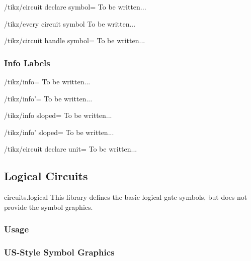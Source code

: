 \begin{key}{/tikz/circuit declare symbol=}
  To be written...
  \begin{stylekey}{/tikz/every circuit symbol}
    To be written...
  \end{stylekey}
\end{key}


\begin{key}{/tikz/circuit handle symbol=}
  To be written...
\end{key}


\subsubsection{Info Labels}

\begin{key}{/tikz/info=}
  To be written...
\end{key}

\begin{key}{/tikz/info'=}
  To be written...
\end{key}

\begin{key}{/tikz/info sloped=}
  To be written...
\end{key}

\begin{key}{/tikz/info' sloped=}
  To be written...
\end{key}

\begin{key}{/tikz/circuit declare unit=}
  To be written...
\end{key}

\subsection{Logical Circuits}


\begin{tikzlibrary}{circuits.logical}
  This library defines the basic logical gate symbols, but does not
  provide the symbol graphics.
\end{tikzlibrary}


\subsubsection{Usage}

\subsubsection{US-Style Symbol Graphics}

